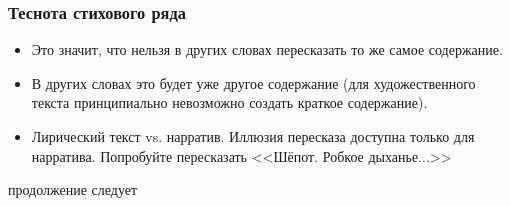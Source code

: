 \documentclass{beamer}
\begin{document}
\begin{frame}
\frametitle{Теснота стихового ряда}

\begin{itemize}
\item Это значит, что нельзя в других словах пересказать то же самое содержание.
\item В других словах это будет уже другое содержание (для художественного текста принципиально невозможно создать краткое содержание).
\item Лирический текст vs. нарратив. Иллюзия пересказа доступна только для нарратива. Попробуйте пересказать <<Шёпот. Робкое дыханье...>>
\end{itemize}



\end{frame}



\begin{frame}
\Huge{\centerline{продолжение следует}}
\end{frame}

\end{document}
